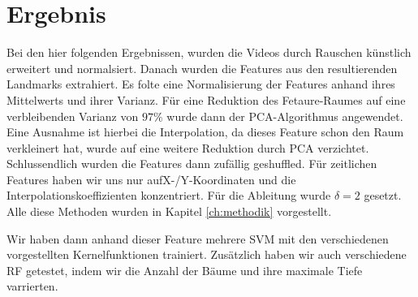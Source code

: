 \chapter{Ergebnis}\label{ch:ergebnis}

Bei den hier folgenden Ergebnissen, wurden die Videos durch Rauschen künstlich erweitert und normalsiert. Danach wurden die Features aus den resultierenden Landmarks extrahiert. Es folte eine Normalisierung der Features anhand ihres Mittelwerts und ihrer Varianz. Für eine Reduktion des Fetaure-Raumes auf eine verbleibenden Varianz von $97\%$ wurde dann der PCA-Algorithmus angewendet. Eine Ausnahme ist hierbei die Interpolation, da dieses Feature schon den Raum verkleinert hat, wurde auf eine weitere Reduktion durch PCA verzichtet. Schlussendlich wurden die Features dann zufällig geshuffled. Für zeitlichen Features haben wir uns nur aufX-/Y-Koordinaten und die Interpolationskoeffizienten konzentriert. Für die Ableitung wurde $\delta=2$ gesetzt.
Alle diese Methoden wurden in Kapitel \ref{ch:methodik} vorgestellt.

Wir haben dann anhand dieser Feature mehrere SVM mit den verschiedenen vorgestellten Kernelfunktionen trainiert. Zusätzlich haben wir auch verschiedene RF getestet, indem wir die Anzahl der Bäume und ihre maximale Tiefe varrierten.



